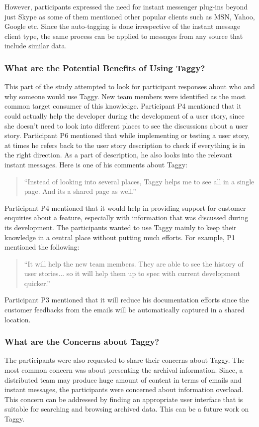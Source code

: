 However, participants expressed the need for instant messenger plug-ins beyond just Skype as some of them mentioned other popular clients such as MSN, Yahoo, Google etc. Since the auto-tagging is done irrespective of the instant message client type, the same process can be applied to messages from any source that include similar data.

\subsubsection{What are the Potential Benefits of Using Taggy?}
This part of the study attempted to look for participant responses about who and why someone would use Taggy. New team members were identified as the most common target consumer of this knowledge. Participant P4 mentioned that it could actually help the developer during the development of a user story, since she doesn't need to look into different places to see the discussions about a user story. Participant P6 mentioned that while implementing or testing a user story, at times he refers back to the user story description to check if everything is in the right direction. As a part of description, he also looks into the relevant instant messages. Here is one of his comments about Taggy:
\begin{quote}
	``Instead of looking into several places, Taggy helps me to see all in a single page. And its a shared page as well.''
\end{quote}

Participant P4 mentioned that it would help in providing support for customer enquiries about a feature, especially with information that was discussed during its development. The participants wanted to use Taggy mainly to keep their knowledge in a central place without putting much efforts. For example, P1 mentioned the following:
\begin{quote}
	``It will help the new team members. They are able to see the history of user stories... so it will help them up to spec with current development quicker.''
\end{quote}
Participant P3 mentioned that it will reduce his documentation efforts since the customer feedbacks from the emails will be automatically captured in a shared location.

\subsubsection{What are the Concerns about Taggy?}
The participants were also requested to share their concerns about Taggy. The most common concern was about presenting the archival information. Since, a distributed team may produce huge amount of content in terms of emails and instant messages, the participants were concerned about information overload. This concern can be addressed by finding an appropriate user interface that is suitable for searching and browsing archived data. This can be a future work on Taggy.

